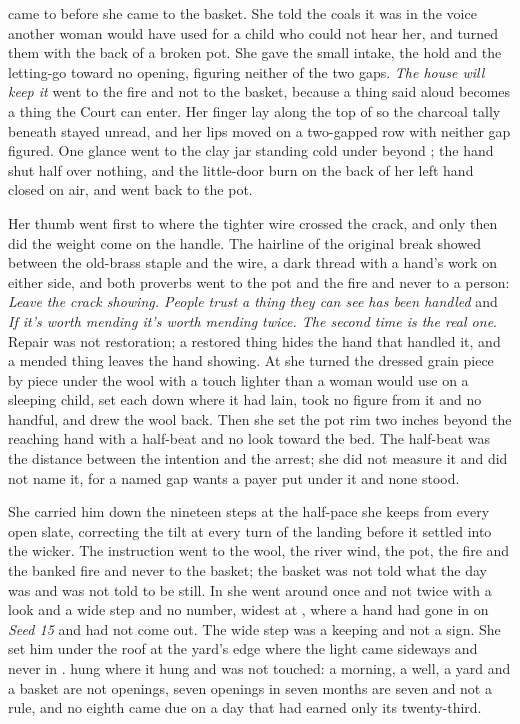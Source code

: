 \scenebreak

 came to  before she came to the basket. She told the coals it was  in the voice another woman would have used for a child who could not hear her, and turned them with the back of a broken pot. She gave the small intake, the hold and the letting-go toward no opening, figuring neither of the two gaps. \emph{The house will keep it} went to the fire and not to the basket, because a thing said aloud becomes a thing the Court can enter. Her finger lay along the top of  so the charcoal tally beneath stayed unread, and her lips moved on a two-gapped row with neither gap figured. One glance went to the clay jar standing cold under  beyond ; the hand shut half over nothing, and the little-door burn on the back of her left hand closed on air, and went back to the pot.

Her thumb went first to where the tighter wire crossed the crack, and only then did the weight come on the handle. The hairline of the original break showed between the old-brass staple and the wire, a dark thread with a hand's work on either side, and both proverbs went to the pot and the fire and never to a person: \emph{Leave the crack showing. People trust a thing they can see has been handled} and \emph{If it's worth mending it's worth mending twice. The second time is the real one}. Repair was not restoration; a restored thing hides the hand that handled it, and a mended thing leaves the hand showing. At  she turned the dressed grain piece by piece under the wool with a touch lighter than a woman would use on a sleeping child, set each down where it had lain, took no figure from it and no handful, and drew the wool back. Then she set the pot rim two inches beyond the reaching hand with a half-beat and no look toward the bed. The half-beat was the distance between the intention and the arrest; she did not measure it and did not name it, for a named gap wants a payer put under it and none stood.

She carried him down the nineteen steps at the half-pace she keeps from every open slate, correcting the tilt at every turn of the landing before it settled into the wicker. The instruction went to the wool, the river wind, the pot, the fire and the banked fire and never to the basket; the basket was not told what the day was and was not told to be still. In  she went around  once and not twice with a look and a wide step and no number, widest at , where a hand had gone in on \emph{Seed 15} and had not come out. The wide step was a keeping and not a sign. She set him under the roof at the yard's edge where the light came sideways and never in .  hung where it hung and was not touched: a morning, a well, a yard and a basket are not openings, seven openings in seven months are seven and not a rule, and no eighth came due on a day that had earned only its twenty-third.

